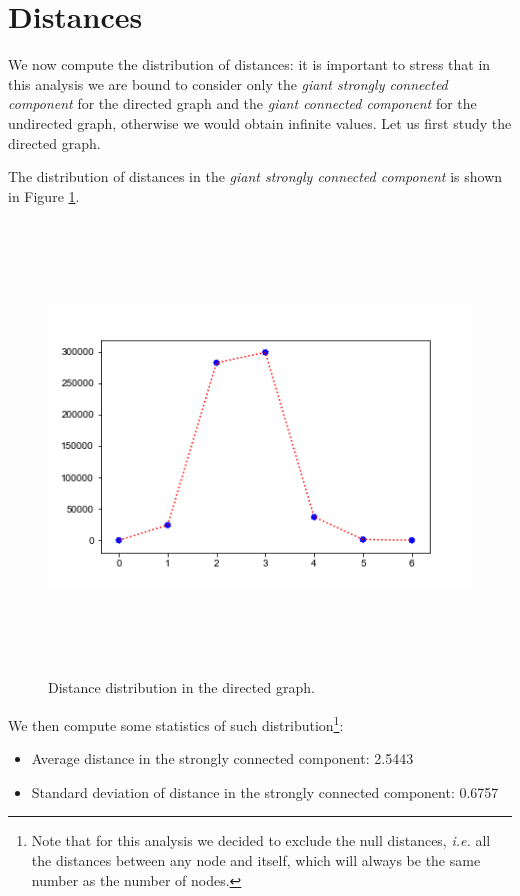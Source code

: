 \documentclass{report}
\theoremstyle{definition}
\theoremstyle{remark}
\begin{document}
\section*{Distances}
We now compute the distribution of distances: it is important to stress that in this analysis we are bound to consider only the \textit{giant strongly connected component} for the directed graph and the \textit{giant connected component} for the undirected graph, otherwise we would obtain infinite values. Let us first study the directed graph.

The distribution of distances in the \textit{giant strongly connected component} is shown in Figure \ref{fig:DistDistrDir}.
\begin{figure} [H]
	\centering
	\centerline{\includegraphics[width = 13cm, height = 12cm, keepaspectratio]{distance_distribution.png}}
	\caption{Distance distribution in the directed graph.} \label{fig:DistDistrDir}
\end{figure}
 We then compute some statistics of such distribution\footnote{Note that for this analysis we decided to exclude the null distances, \textit{i.e.} all the distances between any node and itself, which will always be the same number as the number of nodes.}:
 \begin{itemize}
 	\item Average distance in the strongly connected component: 2.5443
 	\item Standard deviation of distance in the strongly connected component: 0.6757
 \end{itemize}
\end{document}
